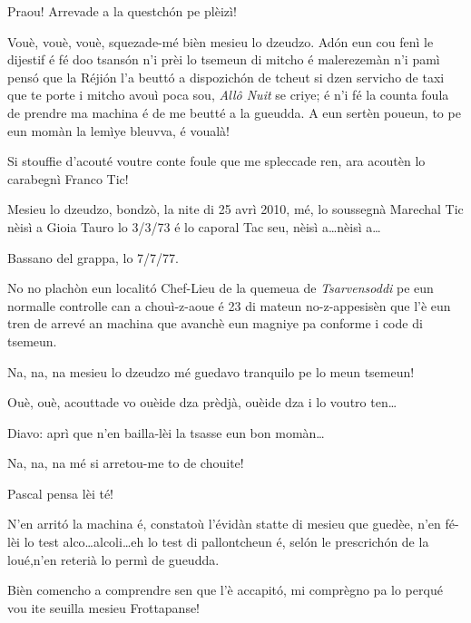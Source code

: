 \begin{drama}
\DzeudzoSenliquerspeaks Praou! Arrevade a la questchón pe plèizì!

\Cienspeaks Vouè, vouè, vouè, squezade-mé bièn mesieu lo dzeudzo. Adón eun cou fenì le dijestif é fé doo tsansón n’i prèi lo tsemeun di mitcho é malerezemàn n’i pamì pensó que la Réjión l’a beuttó a dispozichón de tcheut si dzen servicho de taxi que te porte i mitcho avouì poca sou, \textit{Allô Nuit} se criye; é n’i fé la counta foula de prendre ma machina é de me beutté a la gueudda. A eun sertèn poueun, to pe eun momàn la lemìye bleuvva, é voualà!

\DzeudzoSenliquerspeaks  Si stouffie d'acouté voutre conte foule que me spleccade ren, ara acoutèn lo carabegnì Franco Tic!


\Ticspeaks Mesieu lo dzeudzo, bondzò, la nite di 25 avrì 2010, mé, lo soussegnà Marechal Tic nèisì a Gioia Tauro lo 3/3/73 é lo caporal Tac seu, nèisì a\ldots nèisì a\ldots

\Tacspeaks Bassano del grappa,  lo 7/7/77.

\Ticspeaks  No no plachòn eun localitó Chef-Lieu de la quemeua de \textit{Tsarvensoddi} pe eun normalle controlle can a chouì-z-aoue é 23 di mateun no-z-appesisèn que l’è eun tren de arrevé an machina que avanchè eun magniye pa conforme i code di tsemeun. 

\Cienspeaks Na, na, na mesieu lo dzeudzo mé guedavo tranquilo pe lo meun tsemeun!

\DzeudzoSenliquerspeaks {}  Ouè, ouè, acouttade vo ouèide dza prèdjà, ouèide dza i lo voutro ten\ldots

\Ticspeaks Diavo: aprì que n’en bailla-lèi la tsasse eun bon momàn\ldots

\Cienspeaks Na, na, na mé si arretou-me to de chouite!

\DzeudzoSenliquerspeaks {}  Pascal pensa lèi té!


\Ticspeaks N’en arritó la machina é, constatoù l’évidàn statte di mesieu que guedèe, n’en fé-lèi lo test alco\ldots alcoli\ldots eh lo test di pallontcheun é, selón le prescrichón de la loué,n’en reterià lo permì de gueudda.

\DzeudzoSenliquerspeaks Bièn comencho a comprendre sen que l'è accapitó, mi comprègno pa lo perqué vou ite seuilla mesieu Frottapanse!


\end{drama}
